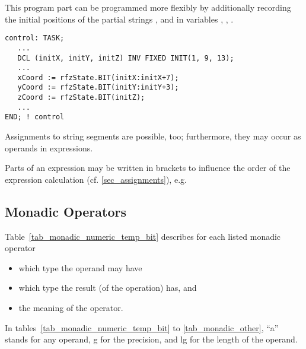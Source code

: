 This program part can be programmed more flexibly by additionally
recording the initial positions of the partial strings ,
and  in variables , , .

\begin{lstlisting}
control: TASK;
   ... 
   DCL (initX, initY, initZ) INV FIXED INIT(1, 9, 13);
   ... 
   xCoord := rfzState.BIT(initX:initX+7);
   yCoord := rfzState.BIT(initY:initY+3);
   zCoord := rfzState.BIT(initZ);
   ... 
END; ! control
\end{lstlisting}

Assignments to string segments are possible, too; furthermore, they may
occur as operands in expressions.

Parts of an expression may be written in brackets to influence the order
of the expression calculation (cf. \ref{sec_assignments}), e.g.


\subsection{Monadic Operators}   %
\label{sec_monadic_operators}

Table~\ref{tab_monadic_numeric_temp_bit}
 describes for each listed monadic operator
\begin{itemize}
\item which type the operand may have
\item which type the result (of the operation) has, and
\item the meaning of the operator.
\end{itemize}
In tables~\ref{tab_monadic_numeric_temp_bit} to \ref{tab_monadic_other}, ``a'' stands for any operand, g for the precision, and lg for
the length of the operand.

